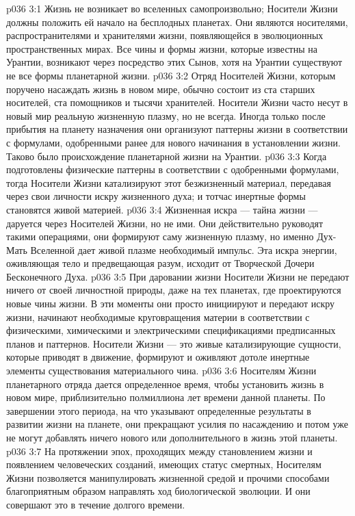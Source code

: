 \vs p036 3:1 Жизнь не возникает во вселенных самопроизвольно; Носители Жизни должны положить ей начало на бесплодных планетах. Они являются носителями, распространителями и хранителями жизни, появляющейся в эволюционных пространственных мирах. Все чины и формы жизни, которые известны на Урантии, возникают через посредство этих Сынов, хотя на Урантии существуют не все формы планетарной жизни.
\vs p036 3:2 Отряд Носителей Жизни, которым поручено насаждать жизнь в новом мире, обычно состоит из ста старших носителей, ста помощников и тысячи хранителей. Носители Жизни часто несут в новый мир реальную жизненную плазму, но не всегда. Иногда только после прибытия на планету назначения они организуют паттерны жизни в соответствии с формулами, одобренными ранее для нового начинания в установлении жизни. Таково было происхождение планетарной жизни на Урантии.
\vs p036 3:3 Когда подготовлены физические паттерны в соответствии с одобренными формулами, тогда Носители Жизни катализируют этот безжизненный материал, передавая через свои личности искру жизненного духа; и тотчас инертные формы становятся живой материей.
\vs p036 3:4 \pc Жизненная искра --- тайна жизни --- даруется через Носителей Жизни, но не ими. Они действительно руководят такими операциями, они формируют саму жизненную плазму, но именно Дух\hyp{}Мать Вселенной дает живой плазме необходимый импульс. Эта искра энергии, оживляющая тело и предвещающая разум, исходит от Творческой Дочери Бесконечного Духа.
\vs p036 3:5 \pc При даровании жизни Носители Жизни не передают ничего от своей личностной природы, даже на тех планетах, где проектируются новые чины жизни. В эти моменты они просто инициируют и передают искру жизни, начинают необходимые круговращения материи в соответствии с физическими, химическими и электрическими спецификациями предписанных планов и паттернов. Носители Жизни --- это живые катализирующие сущности, которые приводят в движение, формируют и оживляют дотоле инертные элементы существования материального чина.
\vs p036 3:6 \pc Носителям Жизни планетарного отряда дается определенное время, чтобы установить жизнь в новом мире, приблизительно полмиллиона лет времени данной планеты. По завершении этого периода, на что указывают определенные результаты в развитии жизни на планете, они прекращают усилия по насаждению и потом уже не могут добавлять ничего нового или дополнительного в жизнь этой планеты.
\vs p036 3:7 На протяжении эпох, проходящих между становлением жизни и появлением человеческих созданий, имеющих статус смертных, Носителям Жизни позволяется манипулировать жизненной средой и прочими способами благоприятным образом направлять ход биологической эволюции. И они совершают это в течение долгого времени.
